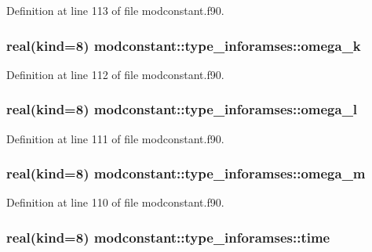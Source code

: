 Definition at line 113 of file modconstant.\-f90.

\hypertarget{structmodconstant_1_1type__inforamses_abd60017888939e8ef8e477f4022860ae}{
\subsubsection[{omega\-\_\-k}]{\setlength{\rightskip}{0pt plus 5cm}real(kind=8) modconstant\-::type\-\_\-inforamses\-::omega\-\_\-k}}\label{structmodconstant_1_1type__inforamses_abd60017888939e8ef8e477f4022860ae}


Definition at line 112 of file modconstant.\-f90.

\hypertarget{structmodconstant_1_1type__inforamses_a60ddbe95c4d1d55b91ca1237073fd776}{
\subsubsection[{omega\-\_\-l}]{\setlength{\rightskip}{0pt plus 5cm}real(kind=8) modconstant\-::type\-\_\-inforamses\-::omega\-\_\-l}}\label{structmodconstant_1_1type__inforamses_a60ddbe95c4d1d55b91ca1237073fd776}


Definition at line 111 of file modconstant.\-f90.

\hypertarget{structmodconstant_1_1type__inforamses_a57115a017792fc0c4a0f1c952e2efaa5}{
\subsubsection[{omega\-\_\-m}]{\setlength{\rightskip}{0pt plus 5cm}real(kind=8) modconstant\-::type\-\_\-inforamses\-::omega\-\_\-m}}\label{structmodconstant_1_1type__inforamses_a57115a017792fc0c4a0f1c952e2efaa5}


Definition at line 110 of file modconstant.\-f90.

\hypertarget{structmodconstant_1_1type__inforamses_ac8a308775ea0956bafceff96094d659d}{
\subsubsection[{time}]{\setlength{\rightskip}{0pt plus 5cm}real(kind=8) modconstant\-::type\-\_\-inforamses\-::time}}\label{structmodconstant_1_1type__inforamses_ac8a308775ea0956bafceff96094d659d}


